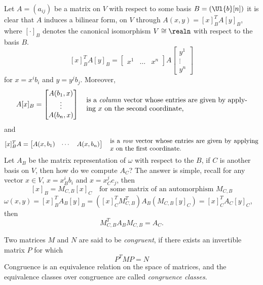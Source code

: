 \documentclass[../main-v2-manifolds.tex]{subfiles}
\begin{document}
    Let $A = (a_{ij})$ be a matrix on $V$ with respect to some basis $B = (\Ul{b}[n])$ it is clear that $A$ induces a bilinear form, on $V$ through $A(x,y) = [x]_B^TA[y]_B$, where $[\cdot]_B$ denotes the canonical isomorphism $V\cong \realn$ with respect to the basis $B$.
    \[
        [x]_B^T A [y]_B = \begin{bmatrix}
            x^1 &\ldots & x^n
        \end{bmatrix}A \begin{bmatrix}
            y^1\\
            \vdots\\
            y^n
        \end{bmatrix}
    \]
    for $x = x^ib_i$ and $y = y^jb_j$. Moreover,
    \[
        A[x]_B = \begin{bmatrix}
            A(b_1,x)\\
            \vdots\\
            A(b_n,x)
        \end{bmatrix}\quad \parbox{8cm}{is a \emph{column} vector whose entries are given by applying $x$ on the second coordinate,}
    \]
    and 
    \[
        [x]_B^T A = \begin{bmatrix}
            A(x,b_1) & \cdots & A(x, b_n)
        \end{bmatrix}\quad\parbox{8cm}{is a \emph{row} vector whose entries are given by applying $x$ on the first coordinate.}
    \]
    Let $A_B$ be the matrix representation of $\omega$ with respect to the $B$, if $C$ is another basis on $V$, then how do we compute $A_C$? The answer is simple, recall for any vector $x\in V$, $x = x^i_Bb_i$ and $x = x^j_C c_j$, then
    \[
        [x]_B = M_{C,B}[x]_C\quad\text{for some matrix of an automorphism }M_{C,B}
    \]
    $\omega(x,y) = [x]_B^TA_B[y]_B = ([x]_C^TM_{C,B}^T)A_B(M_{C,B}[y]_C) = [x]_C^T A_C [y]_C$, then
    \begin{equation}\label{lee-chp22:congruent-matrices}
        M^T_{C,B}A_BM_{C,B} = A_C.
    \end{equation}
    \begin{definition}
        Two matrices $M$ and $N$ are said to be \emph{congruent}, if there exists an invertible matrix $P$ for which
        \[
            P^TMP = N
        \]
        Congruence is an equivalence relation on the space of matrices, and the equivalence classes over congruence are called \emph{congruence classes}.
    \end{definition}
\end{document}
